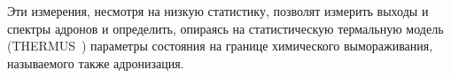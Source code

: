 
Эти измерения, несмотря на низкую статистику, позволят измерить выходы и спектры адронов и определить, опираясь на статистическую термальную модель (THERMUS~\cite{}) параметры состояния на границе химического вымораживания, называемого также адронизация.








